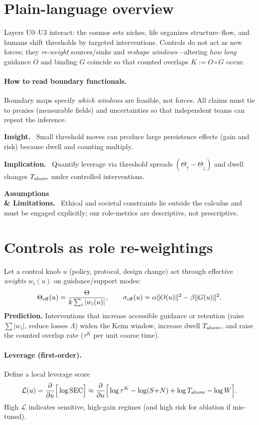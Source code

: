 \documentclass[12pt,a4paper,oneside]{scrreprt}
\newenvironment{insight}{\par\vspace{0.5em}\noindent\textbf{Insight.}\ }{\par\vspace{0.5em}}
\newenvironment{implication}{\par\vspace{0.5em}\noindent\textbf{Implication.}\ }{\par\vspace{0.5em}}
\newenvironment{limitation}{\par\vspace{0.5em}\noindent\textbf{Assumptions \\ \& Limitations.}\ }{\par\vspace{0.5em}}
\begin{document}
\section*{Plain-language overview}
Layers U0–U3 interact: the cosmos sets niches, life organizes structure–flow, and humans shift thresholds by targeted interventions.
Controls do not act as new forces; they \emph{re-weight} sources/sinks and \emph{reshape windows}—altering \emph{how long} guidance $O$ and binding $G$ coincide so that counted overlaps $K:=O\!\circ G$ occur.

\paragraph{How to read boundary functionals.}
Boundary maps specify \emph{which windows} are feasible, not forces. All claims must tie to proxies (measurable fields) and uncertainties so that independent teams can repeat the inference.

\begin{insight}
Small threshold moves can produce large persistence effects (gain and risk) because dwell and counting multiply.
\end{insight}
\begin{implication}
Quantify leverage via threshold spreads $(\Theta_\uparrow-\Theta_\downarrow)$ and dwell changes $T_{\rm above}$ under controlled interventions.
\end{implication}
\begin{limitation}
Ethical and societal constraints lie outside the calculus and must be engaged explicitly; our role-metrics are descriptive, not prescriptive.
\end{limitation}

\section{Controls as role re-weightings}\label{sec:controls-mapping}
Let a control knob $u$ (policy, protocol, design change) act through effective \emph{weights} $w_i(u)$ on guidance/support modes:
\[
\Theta_{\rm eff}(u)=\frac{\Theta}{k\sum_i |w_i(u)|},\qquad 
\sigma_{\rm eff}(u)=\alpha\|O(u)\|^2-\beta\|G(u)\|^2.
\]
\textbf{Prediction.} Interventions that increase accessible guidance or retention (raise $\sum|w_i|$, reduce losses $\Lambda$) widen the Keim window, increase dwell $T_{\rm above}$, and raise the counted overlap rate ($\tau^K$ per unit coarse time).

\paragraph{Leverage (first-order).}
Define a local leverage score
\[
\mathcal L(u)=\frac{\partial}{\partial u}\Big[\log \mathrm{SEC}\Big]
\approx 
\frac{\partial}{\partial u}\Big[
\log \tau^K - \log(S{+}N) + \log T_{\rm above} - \log W
\Big].
\]
High $\mathcal L$ indicates sensitive, high-gain regimes (and high risk for ablation if mis-tuned).
\end{document}
